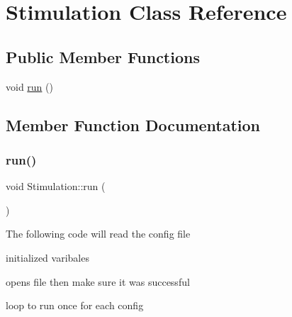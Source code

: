 \hypertarget{class_stimulation}{}\section{Stimulation Class Reference}
\label{class_stimulation}
\subsection*{Public Member Functions}
\begin{DoxyCompactItemize}
\item 
void \mbox{\hyperlink{class_stimulation_a4a2d2160a53f20aa311c83823e148145}{run}} ()
\end{DoxyCompactItemize}


\subsection{Member Function Documentation}
\mbox{\label{class_stimulation_a4a2d2160a53f20aa311c83823e148145}} 
\subsubsection{\texorpdfstring{run()}{run()}}
{\footnotesize\ttfamily void Stimulation\+::run (\begin{DoxyParamCaption}{ }\end{DoxyParamCaption})}

The following code will read the config file

initialized varibales

opens file then make sure it was successful

loop to run once for each config

